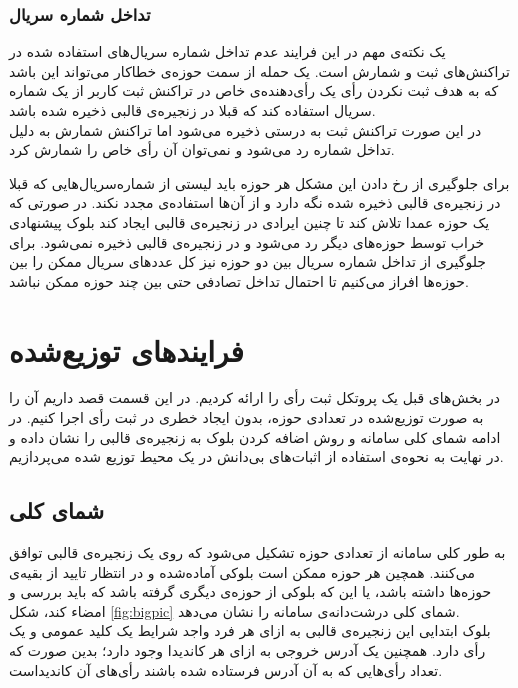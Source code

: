 \subsubsection{تداخل شماره سریال}
یک نکته‌ی مهم در این فرایند عدم تداخل شماره سریال‌های استفاده شده در تراکنش‌های ثبت و شمارش است. یک حمله از سمت حوزه‌ی خطاکار می‌تواند این باشد که به هدف ثبت نکردن رأی یک رأی‌دهنده‌ی خاص در تراکنش ثبت کاربر از یک شماره سریال استفاده کند که قبلا در زنجیره‌ی قالبی ذخیره شده باشد. 
\\
در این صورت تراکنش ثبت به درستی ذخیره می‌شود اما تراکنش شمارش به دلیل تداخل شماره رد می‌شود و نمی‌توان آن رأی خاص را شمارش کرد. 
\par 
برای جلوگیری از رخ دادن این مشکل هر حوزه باید لیستی از شماره‌سریال‌هایی که قبلا در زنجیره‌ی قالبی ذخیره شده نگه دارد و از آن‌ها استفاده‌ی مجدد نکند. در صورتی که یک حوزه عمدا تلاش کند تا چنین ایرادی در زنجیره‌ی قالبی ایجاد کند بلوک پیشنهادی خراب توسط حوزه‌های دیگر رد می‌شود و در زنجیره‌ی قالبی ذخیره نمی‌شود. برای جلوگیری از تداخل شماره سریال بین دو حوزه نیز کل عددهای سریال ممکن را بین حوزه‌ها افراز می‌کنیم تا احتمال تداخل تصادفی حتی بین چند حوزه ممکن نباشد.
\section{فرایند‌های توزیع‌شده}
در بخش‌های قبل یک پروتکل ثبت رأی‌ را ارائه کردیم. در این قسمت قصد داریم آن را به صورت توزیع‌شده در تعدادی حوزه، بدون ایجاد خطری در ثبت رأی اجرا کنیم. در ادامه شمای کلی سامانه و روش‌ اضافه کردن بلوک به زنجیره‌ی قالبی را نشان داده و در نهایت به نحوه‌ی استفاده از اثبات‌های بی‌دانش در یک محیط توزیع شده می‌پردازیم.
\subsection{شمای کلی}
به طور کلی سامانه از تعدادی حوزه‌ تشکیل می‌شود که روی یک زنجیره‌ی قالبی توافق می‌کنند. همچین هر حوزه ممکن است بلوکی آماده‌شده و در انتظار تایید از بقیه‌ی حوزه‌ها داشته باشد، یا این که بلوکی از حوزه‌ی دیگری گرفته باشد که باید بررسی و امضاء کند، شکل \ref{fig:bigpic} شمای کلی درشت‌دانه‌ی سامانه را نشان می‌دهد.
\\
بلوک ابتدایی این زنجیره‌ی قالبی به ازای هر فرد واجد شرایط یک کلید عمومی و یک رأی ‌دارد. همچنین یک آدرس خروجی به ازای هر کاندیدا وجود دارد؛ بدین صورت که تعداد رأی‌هایی که به آن آدرس فرستاده شده باشند رأی‌های آن‌ کاندیداست. 
 
